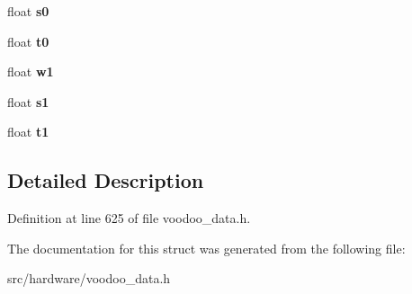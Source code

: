 \begin{DoxyCompactItemize}
\item 
\hypertarget{struct__setup__vertex_a6ccc1fdc7116fbdeb9f4672cd39b0e8a}{float {\bfseries s0}}\label{struct__setup__vertex_a6ccc1fdc7116fbdeb9f4672cd39b0e8a}

\item 
\hypertarget{struct__setup__vertex_acbc3cadd1fe4e37377966054072a315b}{float {\bfseries t0}}\label{struct__setup__vertex_acbc3cadd1fe4e37377966054072a315b}

\item 
\hypertarget{struct__setup__vertex_a7e64c083cfbb501bf04c3c511e94a5bb}{float {\bfseries w1}}\label{struct__setup__vertex_a7e64c083cfbb501bf04c3c511e94a5bb}

\item 
\hypertarget{struct__setup__vertex_aa6217f047e6679ea5f1e1e121ef4ae03}{float {\bfseries s1}}\label{struct__setup__vertex_aa6217f047e6679ea5f1e1e121ef4ae03}

\item 
\hypertarget{struct__setup__vertex_a0c96492280733b050bccc74d2f6c1d1e}{float {\bfseries t1}}\label{struct__setup__vertex_a0c96492280733b050bccc74d2f6c1d1e}

\end{DoxyCompactItemize}


\subsection{Detailed Description}


Definition at line 625 of file voodoo\-\_\-data.\-h.



The documentation for this struct was generated from the following file\-:\begin{DoxyCompactItemize}
\item 
src/hardware/voodoo\-\_\-data.\-h\end{DoxyCompactItemize}
